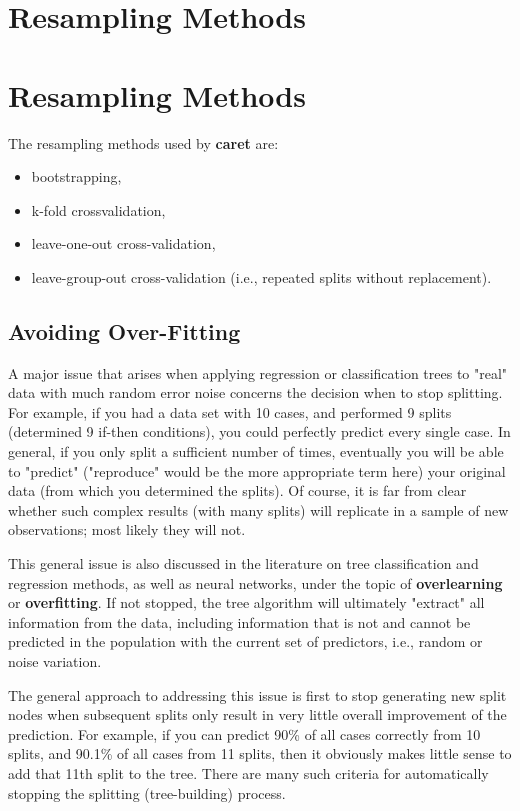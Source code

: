 \documentclass[caret-main.tex]{subfiles}
\begin{document}
\section{Resampling Methods}

\newpage
\section{Resampling Methods}
The resampling methods used by \textbf{caret} are:
\begin{itemize}
\item bootstrapping, 
\item k-fold crossvalidation,
\item leave-one-out cross-validation,
\item  leave-group-out cross-validation (i.e., repeated
splits without replacement).
\end{itemize}

\subsection{Avoiding Over-Fitting}

A major issue that arises when applying regression or classification trees to "real" data with much random error noise concerns the decision when to stop splitting. For example, if you had a data set with 10 cases, and performed 9 splits (determined 9 if-then conditions), you could perfectly predict every single case. In general, if you only split a sufficient number of times, eventually you will be able to "predict" ("reproduce" would be the more appropriate term here) your original data (from which you determined the splits). Of course, it is far from clear whether such complex results (with many splits) will replicate in a sample of new observations; most likely they will not.

This general issue is also discussed in the literature on tree classification and regression methods, as well as neural networks, under the topic of \textbf{overlearning} or \textbf{overfitting}.
 If not stopped, the tree algorithm will ultimately "extract" all information from the data, including information that is not and cannot be predicted in the population with the current set of predictors, i.e., random or noise variation. 

The general approach to addressing this issue is first to stop generating new split nodes when subsequent splits only result in very little overall improvement of the prediction. For example, if you can predict 90\% of all cases correctly from 10 splits, and 90.1\% of all cases from 11 splits, then it obviously makes little sense to add that 11th split to the tree. There are many such criteria for automatically stopping the splitting (tree-building) process.
\end{document}

